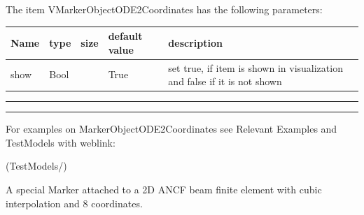 \noindent The item VMarkerObjectODE2Coordinates has the following parameters:
\begin{center}
  \footnotesize
  \begin{longtable}{| p{4.5cm} | p{2.5cm} | p{0.5cm} | p{2.5cm} | p{6cm} |}
    \hline
    \bf Name & \bf type & \bf size & \bf default value & \bf description \\ \hline
    show &     Bool &      &     True &     set true, if item is shown in visualization and false if it is not shown\\ \hline
\end{longtable}
\end{center}
\par\noindent\rule{\textwidth}{0.4pt}
\label{description_MarkerObjectODE2Coordinates}
\vspace{6pt}\par\noindent\rule{\textwidth}{0.4pt}
%
\noindent For examples on MarkerObjectODE2Coordinates see Relevant Examples and TestModels with weblink:
\bi
\item {} (TestModels/)

\ei

%
\newpage


\label{sec:item:MarkerBodyCable2DShape}
A special Marker attached to a 2D ANCF beam finite element with cubic interpolation and 8 coordinates.
\vspace{12pt}\\

